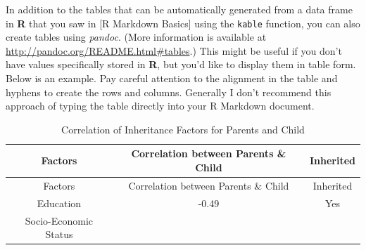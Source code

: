 \documentclass [11pt, proquest] {uwthesis}[2015/03/03]
\begin{document}
In addition to the tables that can be automatically generated from a
data frame in \textbf{R} that you saw in {[}R Markdown Basics{]} using
the \texttt{kable} function, you can also create tables using
\emph{pandoc}. (More information is available at
\url{http://pandoc.org/README.html\#tables}.) This might be useful if
you don't have values specifically stored in \textbf{R}, but you'd like
to display them in table form. Below is an example. Pay careful
attention to the alignment in the table and hyphens to create the rows
and columns. Generally I don't recommend this approach of typing the
table directly into your R Markdown document.
\begin{longtable}[]{@{}ccc@{}}
\caption{\label{tab:inher} Correlation of Inheritance Factors for Parents
and Child}\tabularnewline
\toprule
\begin{minipage}[b]{0.29\columnwidth}\centering\strut
Factors\strut
\end{minipage} & \begin{minipage}[b]{0.47\columnwidth}\centering\strut
Correlation between Parents \& Child\strut
\end{minipage} & \begin{minipage}[b]{0.16\columnwidth}\centering\strut
Inherited\strut
\end{minipage}\tabularnewline
\midrule
\endfirsthead
\toprule
\begin{minipage}[b]{0.29\columnwidth}\centering\strut
Factors\strut
\end{minipage} & \begin{minipage}[b]{0.47\columnwidth}\centering\strut
Correlation between Parents \& Child\strut
\end{minipage} & \begin{minipage}[b]{0.16\columnwidth}\centering\strut
Inherited\strut
\end{minipage}\tabularnewline
\midrule
\endhead
\begin{minipage}[t]{0.29\columnwidth}\centering\strut
Education\strut
\end{minipage} & \begin{minipage}[t]{0.47\columnwidth}\centering\strut
-0.49\strut
\end{minipage} & \begin{minipage}[t]{0.16\columnwidth}\centering\strut
Yes\strut
\end{minipage}\tabularnewline
\begin{minipage}[t]{0.29\columnwidth}\centering\strut
Socio-Economic Status\strut
\end{minipage} & \begin{minipage}[t]{0.47\columnwidth}\centering\strut

\end{minipage}
\end{longtable}
\end{document}
